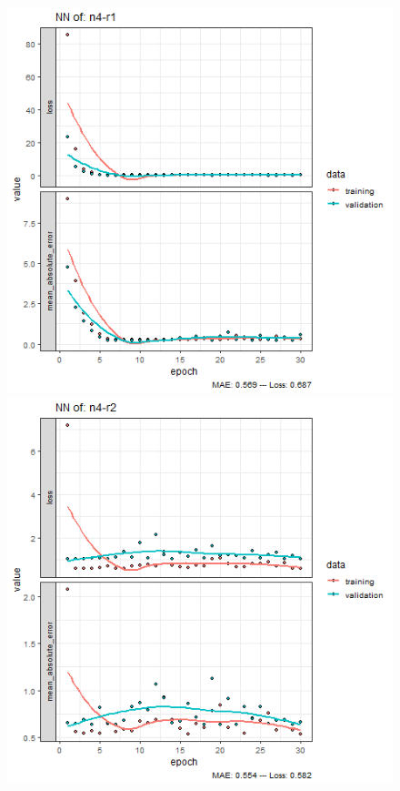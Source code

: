 \documentclass{FR16}
\begin{document}
\begin{figure}[!htb]

   \begin{minipage}{0.33\textwidth}
     \centering
     \includegraphics[width=1\linewidth]{figures/NN-n4-r1.png} 
   \end{minipage}\hfill
   \begin{minipage}{0.33\textwidth}
     \centering
     \includegraphics[width=1\linewidth]{figures/NN-n4-r2.png}

\end{minipage}
\end{figure}
\end{document}
